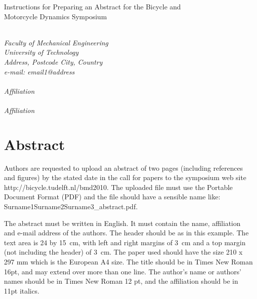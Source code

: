 \documentclass{bmd2010a}
\begin{document}
\begin{flushleft}
{\fontsize{16pt}{20pt}\selectfont%
  Instructions for Preparing an Abstract for the Bicycle and\\}
{\fontsize{16pt}{20pt}\selectfont%
  Motorcycle Dynamics Symposium\\}
\end{flushleft}

\begin{flushleft}
  {\\}
  \textit{Faculty of Mechanical Engineering\\
          University of Technology\\
          Address, Postcode City, Country\\
          e-mail: email1@address
}\vspace{10pt}\\
  {\\}
  \textit{Affiliation}\vspace{10pt}\\
  {\\}
  \textit{Affiliation}\vspace{10pt}\\
\end{flushleft}

\section*{Abstract}
Authors are requested to upload an abstract of two pages (including references
and figures) by the stated date in the call for papers to the symposium web
site http://bicycle.tudelft.nl/bmd2010. The uploaded file must use the
Portable Document Format (PDF) and the file should have a sensible name like: Surname1Surname2Surname3\_abstract.pdf.

The abstract must be written in English. It must contain the name, affiliation
and e-mail address of the authors. The header should be as in
this example. The text area is 24 by 15~cm, with left and right margins of
3~cm and a top margin (not including the header) of 3~cm. The paper used should have the size 210 x 297 mm which is the European A4 size. The title should be
in Times New Roman 16pt, and may extend over more than one line. The author's
name or authors' names should be in Times New Roman 12 pt, and the affiliation
should be in 11pt italics.
\end{document}
